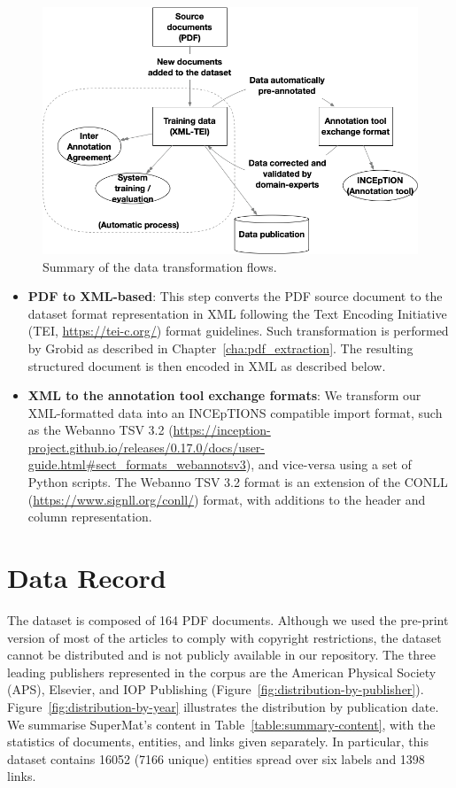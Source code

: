 \begin{figure}[htbp]
    \centering
    \includegraphics[width=\linewidth]{figures/supermat/Fig3.png}
    \caption{Summary of the data transformation flows.}
    \label{fig:data-transformation}
\end{figure}

\begin{itemize}
    \item \textbf{PDF to XML-based}: This step converts the PDF source document to the dataset format representation in XML following the Text Encoding Initiative (TEI, \url{https://tei-c.org/}) format guidelines. 
    Such transformation is performed by Grobid as described in Chapter~\ref{cha:pdf_extraction}. 
    The resulting structured document is then encoded in XML as described below. 
    \item \textbf{XML to the annotation tool exchange formats}: We transform our XML-formatted data into an INCEpTIONS compatible import format, such as the Webanno TSV 3.2 (\url{https://inception-project.github.io/releases/0.17.0/docs/user-guide.html\#sect_formats_webannotsv3}), and vice-versa using a set of Python scripts. 
    The Webanno TSV 3.2 format is an extension of the CONLL (\url{https://www.signll.org/conll/}) format, with additions to the header and column representation.
\end{itemize}

\section{Data Record}
\label{sec:data-record}
The dataset is composed of 164 PDF documents. Although we used the pre-print version of most of the articles to comply with copyright restrictions, the dataset cannot be distributed and is not publicly available in our repository. 
The three leading publishers represented in the corpus are the American Physical Society (APS), Elsevier, and IOP Publishing (Figure~\ref{fig:distribution-by-publisher}).
Figure~\ref{fig:distribution-by-year} illustrates the distribution by publication date.
We summarise SuperMat's content in Table~\ref{table:summary-content}, with the statistics of documents, entities, and links given separately. In particular, this dataset contains 16052 (7166 unique) entities spread over six labels and 1398 links. 

